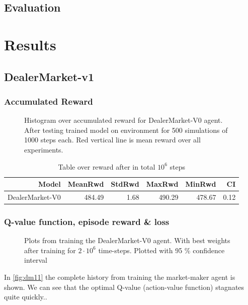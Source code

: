 \documentclass{kththesis}
\theoremstyle{definition}
\begin{document}
\section{Evaluation}

\chapter{Results}

\section{DealerMarket-v1}

\subsection*{Accumulated Reward}

\begin{figure}[H]
	    	\centering
		
		\caption{Histogram over accumulated reward for DealerMarket-V0 agent. After testing trained model on environment for 500 simulations of 1000 steps each. Red vertical line is mean reward over all experiments. }
		\label{fig:dm1}
\end{figure}

\begin{table}[H]
\centering
\begin{tabular}{rrrrrr}
  \hline
 \textbf{Model} & \textbf{MeanRwd} & \textbf{StdRwd} & \textbf{MaxRwd} & \textbf{MinRwd} & \textbf{CI} \\ 
  \hline
DealerMarket-V0 & 484.49 & 1.68 & 490.29 & 478.67 & 0.12 \\ 
   \hline
\end{tabular}
\label{tab:dm1}
\caption{Table over reward after in total $10^6$ steps}
\end{table}

\subsection*{Q-value function, episode reward \& loss}
\begin{figure}[H]
	    	\centering
		
		\caption{Plots from training the DealerMarket-V0 agent. With best weights after training for $2\cdot 10^{6}$ time-steps. Plotted with 95 \% confidence interval}
		\label{fig:dm11}
\end{figure}
In \autoref{fig:dm11} the complete history from training the market-maker agent is shown. We can see that the optimal Q-value (action-value function) stagnates quite quickly..
\end{document}
